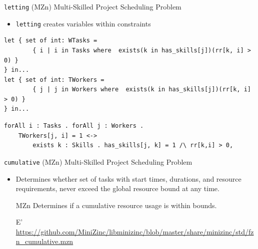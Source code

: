 \documentclass{beamer}
\begin{document}
\begin{frame}[containsverbatim]{\texttt{letting} (MZn)}
Multi-Skilled Project Scheduling Problem
\begin{itemize}
    \item \texttt{letting} creates variables within constraints
\end{itemize}
\begin{lstlisting}[basicstyle=\tiny, language=minizinc]
let { set of int: WTasks =
        { i | i in Tasks where  exists(k in has_skills[j])(rr[k, i] > 0) }
} in...
let { set of int: TWorkers = 
        { j | j in Workers where  exists(k in has_skills[j])(rr[k, i] > 0) }
} in...
\end{lstlisting}
\begin{lstlisting}[basicstyle=\tiny, language=eprime]
forAll i : Tasks . forAll j : Workers .
    TWorkers[j, i] = 1 <-> 
        exists k : Skills . has_skills[j, k] = 1 /\ rr[k,i] > 0,
\end{lstlisting}
\end{frame}


\begin{frame}{\texttt{cumulative} (MZn)}
Multi-Skilled Project Scheduling Problem
\begin{itemize}
    \item Determines whether set of tasks with start times, durations, and resource requirements, never exceed the global resource bound at any time.
    \item[MZn] Determines if a cumulative resource usage is within bounds.
    \item[E'] \url{https://github.com/MiniZinc/libminizinc/blob/master/share/minizinc/std/fzn_cumulative.mzn}
\end{itemize}
\end{frame}
\end{document}
